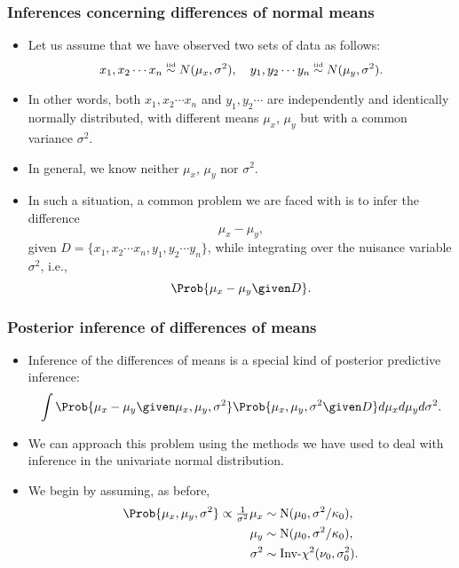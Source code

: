 \documentclass{slides}
\begin{document}
\begin{frame}
	\frametitle{Inferences concerning differences of normal means}
	\begin{itemize}
		\item Let us assume that we have observed two sets of data as follows:
			\[x_1, x_2 \cdots x_n \iidsim N(\mu_{x}, \sigma^2), \quad y_1, y_2 \cdots y_n \iidsim N(\mu_{y}, \sigma^2).\]

		\item In other words, both $x_1, x_2 \cdots x_n$ and $y_1, y_2 \cdots$ are independently and identically normally distributed, with different means $\mu_x$, $\mu_y$ but with a common variance $\sigma^2$.
		\item In general, we know neither $\mu_x$, $\mu_y$ nor $\sigma^2$.
		\item In such a situation, a common problem we are faced with is to infer the difference
			\[ \mu_x - \mu_y,\]
			given $D=\{x_1, x_2 \cdots x_n, y_1, y_2 \cdots y_n\}$, while integrating over the nuisance variable $\sigma^2$, i.e.,
			\[
				\Prob{\mu_x - \mu_y \given D}.
			\]
	\end{itemize}
\end{frame}

\begin{frame}
	\frametitle{Posterior inference of differences of means}
	\begin{itemize}
		\item Inference of the differences of means is a special kind of posterior predictive inference:
			\[
				\int \Prob{\mu_x - \mu_y \given \mu_x, \mu_y, \sigma^2}\Prob{\mu_x, \mu_y, \sigma^2\given D} d\mu_xd\mu_yd\sigma^2.
			\]
		\item We can approach this problem using the methods we have used to deal with inference in the univariate normal distribution.
		\item We begin by assuming, as before,
			\begin{align*}
				\Prob{\mu_x, \mu_y, \sigma^2} \propto \tfrac{1}{\sigma^2}
				\mu_x &\sim \textrm{N}(\mu_0, \sigma^2/\kappa_0),\\
				\mu_y &\sim \textrm{N}(\mu_0, \sigma^2/\kappa_0),\\
				\sigma^2 &\sim \textrm{Inv-}\chi^2(\nu_0, \sigma^2_0).
			\end{align*}

	\end{itemize}
\end{frame}
\end{document}
